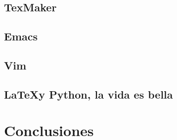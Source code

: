 \subsection{TexMaker}
\subsection{Emacs}
\subsection{Vim}


\subsection{\LaTeX y Python, la vida es bella}


\section{Conclusiones}


